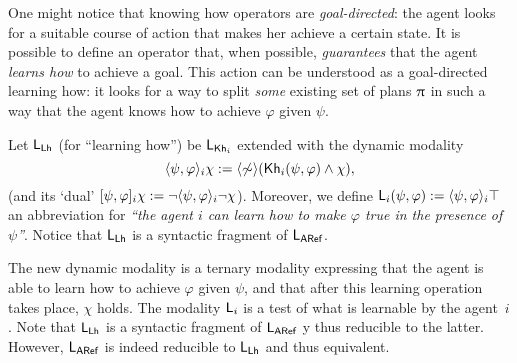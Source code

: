 One might notice that knowing how operators are \emph{goal-directed}: the agent looks for a suitable course of action that makes her achieve a certain state.
It is possible to define an operator that, when possible, \emph{guarantees} that the agent \emph{learns how} to achieve a goal.
This action can be understood as a goal-directed learning how: it looks for a way to split \emph{some} existing set of plans $\uppi$ in such a way that the agent knows how to achieve $\varphi$ given $\psi$. 

Let $\mathsf{L_{Lh}}$ (for ``learning how'') be $\mathsf{L}_{{\sf Kh}_i}$ extended with the dynamic modality
\[
\langle \psi,\varphi \rangle_i\chi := \langle \not\sim \rangle({\sf Kh}_i(\psi,\varphi) \wedge\chi),
\]
(and its `dual' $[\psi,\varphi]_i\chi := \neg\langle \psi,\varphi \rangle_i\neg\chi$).
Moreover, we define ${\sf L}_i(\psi,\varphi) := \langle \psi,\varphi \rangle_i\top$ an abbreviation for \emph{``the agent $i$ can learn how to make $\varphi$ true in the presence of $\psi$''}.
Notice that $\mathsf{L_{Lh}}$ is a syntactic fragment of $\mathsf{L_{ARef}}$.

The new dynamic modality is a ternary modality expressing that the agent is able to learn how to achieve $\varphi$ given $\psi$, and that after this learning operation takes place, $\chi$ holds.
The modality ${\sf L}_i$ is a test of what is learnable by the agent~$i$.
Note that $\mathsf{L_{Lh}}$ is a syntactic fragment of $\mathsf{L_{ARef}}$ y thus reducible to the latter.
However, $\mathsf{L_{ARef}}$ is indeed reducible to $\mathsf{L_{Lh}}$ and thus equivalent.

\medskip

